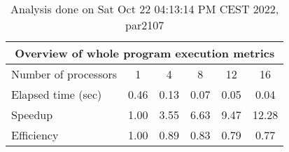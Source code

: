 \begin{table}[h]
\begin{center}
\begin{tabular}{|l|c|c|c|c|c|}
\hline
\multicolumn{6}{|c|}{Overview of whole program execution metrics} \\
\hline
\hline
Number of processors & 1 & 4 & 8 & 12 & 16 \\
\hline
Elapsed time (sec)      &       0.46 &       0.13 &       0.07 &       0.05 &       0.04 \\
\hline
Speedup                 &       1.00 &       3.55 &       6.63 &       9.47 &      12.28 \\
\hline
Efficiency              &       1.00 &       0.89 &       0.83 &       0.79 &       0.77 \\
\hline
\end{tabular}
\end{center}
\caption{ Analysis done on Sat Oct 22 04:13:14 PM CEST 2022, par2107}
\end{table}
